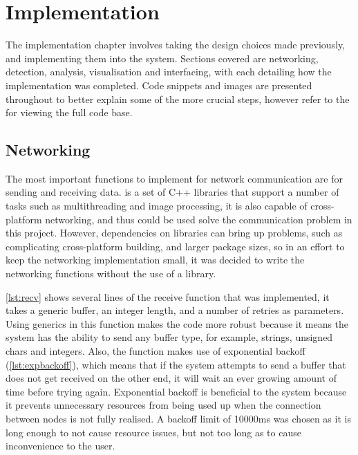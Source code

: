 
\chapter{Implementation}\label{chap:implementation}

The implementation chapter involves taking the design choices made previously, and implementing them into the system. Sections covered are networking, detection, analysis, visualisation and interfacing, with each detailing how the implementation was completed. Code snippets and images are presented throughout to better explain some of the more crucial steps, however refer to the  for viewing the full code base.

\section{Networking}
The most important functions to implement for network communication are for sending and receiving data. \citet{boost} is a set of C++ libraries that support a number of tasks such as multithreading and image processing, it is also capable of cross-platform networking, and thus could be used solve the communication problem in this project. However, dependencies on libraries can bring up problems, such as complicating cross-platform building, and larger package sizes, so in an effort to keep the networking implementation small, it was decided to write the networking functions without the use of a library.

\cref{lst:recv} shows several lines of the receive function that was implemented, it takes a generic buffer, an integer length, and a number of retries as parameters. Using generics in this function makes the code more robust because it means the system has the ability to send any buffer type, for example, strings, unsigned chars and integers. Also, the function makes use of exponential backoff (\cref{lst:expbackoff}), which means that if the system attempts to send a buffer that does not get received on the other end, it will wait an ever growing amount of time before trying again. Exponential backoff is beneficial to the system because it prevents unnecessary resources from being used up when the connection between nodes is not fully realised. A backoff limit of 10000ms was chosen as it is long enough to not cause resource issues, but not too long as to cause inconvenience to the user.

